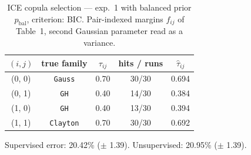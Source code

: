 \begin{table}[htbp]
  \centering
  \caption{ICE copula selection — exp.\ 1 with balanced prior $p_{\text{bal}}$, criterion: BIC. Pair-indexed margins $f_{ij}$ of Table~1, second Gaussian parameter read as a variance.}
  \label{tab:exp3-exp1_bal_p__bic}
  \begin{tabular}{ccccc}
    \toprule
    $(i, j)$ & true family & $\tau_{ij}$ & hits / runs & $\hat\tau_{ij}$ \\
    \midrule
    (0, 0) & \texttt{Gauss} & 0.70 & 30/30 & 0.694 \\
    (0, 1) & \texttt{GH} & 0.40 & 14/30 & 0.384 \\
    (1, 0) & \texttt{GH} & 0.40 & 13/30 & 0.394 \\
    (1, 1) & \texttt{Clayton} & 0.70 & 30/30 & 0.692 \\
    \bottomrule
  \end{tabular}
  \par\smallskip Supervised error: 20.42\% ($\pm$ 1.39). Unsupervised: 20.95\% ($\pm$ 1.39).
\end{table}
